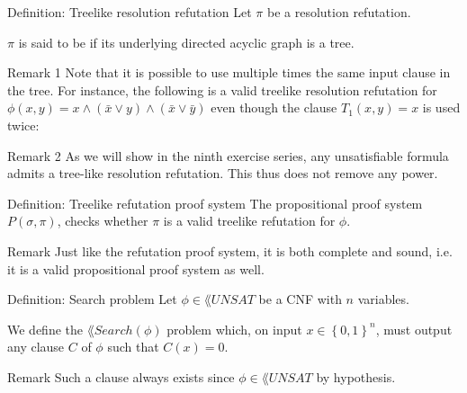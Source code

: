 \documentclass[a4paper]{article}
\begin{document}
\begin{parag}{Definition: Treelike resolution refutation}
    Let $\pi$ be a resolution refutation.

    $\pi$ is said to be  if its underlying directed acyclic graph is a tree. 

    \begin{subparag}{Remark 1}
        Note that it is possible to use multiple times the same input clause in the tree. For instance, the following is a valid treelike resolution refutation for $\phi\left(x, y\right) = x \land \left(\bar{x} \lor y\right) \land \left(\bar{x} \lor \bar{y}\right)$ even though the clause $T_1\left(x, y\right) = x$ is used twice:
    \end{subparag}

    \begin{subparag}{Remark 2}
        As we will show in the ninth exercise series, any unsatisfiable formula admits a tree-like resolution refutation. This thus does not remove any power. 
    \end{subparag}
\end{parag}

\begin{parag}{Definition: Treelike refutation proof system}
    The  propositional proof system $P\left(\sigma, \pi\right)$, checks whether $\pi$ is a valid treelike refutation for $\phi$.

    \begin{subparag}{Remark}
        Just like the refutation proof system, it is both complete and sound, i.e. it is a valid propositional proof system as well.
    \end{subparag}
\end{parag}

\begin{parag}{Definition: Search problem}
    Let $\phi \in \lang{UNSAT}$ be a CNF with $n$ variables.

    We define the $\lang{Search}\left(\phi\right)$ problem which, on input $x \in \left\{0, 1\right\}^n$, must output any clause $C$ of $\phi$ such that $C\left(x\right) = 0$.
    
    \begin{subparag}{Remark}
        Such a clause always exists since $\phi \in \lang{UNSAT}$ by hypothesis.
    \end{subparag}
\end{parag}
\end{document}
